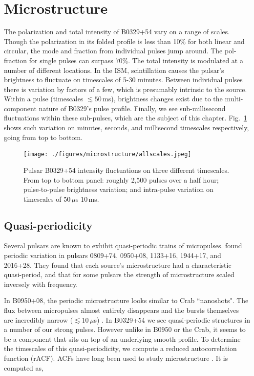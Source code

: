 \section{Microstructure}

The polarization and 
total intensity of B0329+54 vary on a range of scales. 
Though the polarization in its folded profile is less than 
10$\%$ for both linear and circular, the 
mode and fraction from individual pulses 
jump around. The pol-fraction for single pulses 
can surpass $70\%$. The total intensity is modulated 
at a number of different locations.
In the ISM, scintillation causes the pulsar's brightness to fluctuate 
on timescales of 5-30 minutes. Between individual pulses there is  
variation by factors of a few, which is presumably intrinsic 
to the source. Within a pulse (timescales $\lesssim 50$\,ms), 
brightness changes exist due to the multi-component nature 
of B0329's pulse profile. Finally, 
we see sub-millisecond fluctuations within these sub-pulses, 
which are the subject of this chapter.
Fig.~\ref{fig-alltscales} shows such variation on 
minutes, seconds, and millisecond timescales respectively,
going from top to bottom.

\begin{figure}[!h]
\begin{center}
\texttt{[image: ./figures/microstructure/allscales.jpeg]}
\caption{Pulsar B0329+54 intensity fluctuations 
on three different timescales. From top to bottom panel: roughly 
2,500 pulses over a half hour; pulse-to-pulse brightness 
variation; and intra-pulse variation on timescales of 50\,$\mu$s-10\,ms.}
\vspace{-0.75cm}   
\label{fig-alltscales}
\end{center}
\end{figure} 

\subsection{Quasi-periodicity}

Several pulsars are known to exhibit quasi-periodic 
trains of micropulses. \citet{1990AJ....100.1882C} 
found periodic variation in pulsars 0809+74, 0950+08, 
1133+16, 1944+17, and 2016+28. They found that each 
source's microstructure had a characteristic quasi-period, 
and that for some pulsars the strength of microstructure 
scaled inversely with frequency. 

In B0950+08, the periodic microstructure 
looks similar to Crab ``nanoshots".
The flux between micropulses almost entirely disappears 
and the bursts themselves are incredibly narrow ($\lesssim$10\,$\mu$s)
\citep{2002ARep...46..206P}. 
In B0329+54 we see quasi-periodic structures in a 
number of our strong pulses. However unlike in B0950 or 
the Crab, it seems to be a component that sits on 
top of an underlying smooth profile. To determine the 
timescales of this quasi-periodicity, we compute 
a reduced autocorrelation function (rACF). ACFs
have long been used to study microstructure
\citep[see][]{1978AZh....55.1024K, 1998A&A...332..111L}. 
It is computed as,

